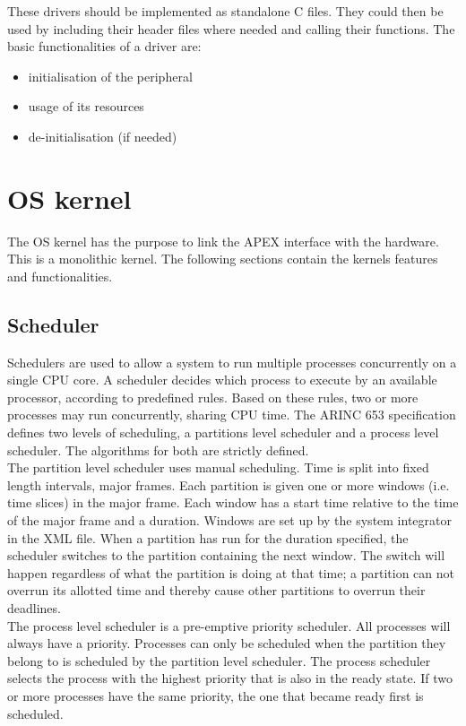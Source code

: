 These drivers should be implemented as standalone C files. They could then
be used by including their header files where needed and calling their
functions.
The basic functionalities of a driver are:
\begin{itemize}[noitemsep]
	\item initialisation of the peripheral
	\item usage of its resources
	\item de-initialisation (if needed)
\end{itemize}


\section{OS kernel}
The OS kernel has the purpose to link the APEX interface with the hardware.
This is a monolithic kernel. The following sections contain
the kernel\textquotesingle s features and functionalities.


\subsection{Scheduler}
\label{ssec:design_scheduling}
Schedulers are used to allow a system to run multiple processes concurrently on a single CPU core.
A scheduler decides which process to execute by an available processor,
according to predefined rules. Based on these rules, two or
more processes may run concurrently, sharing CPU time. The ARINC 653
specification defines two levels of scheduling, a partitions level scheduler and a
process level scheduler. The algorithms for both are strictly defined.\\

The partition level scheduler uses manual scheduling. Time is split into fixed
length intervals, major frames. Each partition is given one or more windows
(i.e. time slices) in the major frame. Each window has a start time
relative to the time of the major frame and a duration. Windows are set up by
the system integrator in the XML file\cite{arinc_part_scheduling}.
When a partition has run for the duration specified, the scheduler
switches to the partition containing the next window. The switch will happen regardless of
what the partition is doing at that time; a partition can not overrun its
allotted time and thereby cause other partitions to overrun their deadlines.\\

The process level scheduler is a pre-emptive priority scheduler. All processes
will always have a priority. Processes can only be scheduled when the
partition they belong to is scheduled by the partition level scheduler. The
process scheduler selects the process with the highest priority that is also
in the ready state. If two or more processes have the same priority, the one
that became ready first is scheduled\cite{arinc_pro_scheduling}.\\

